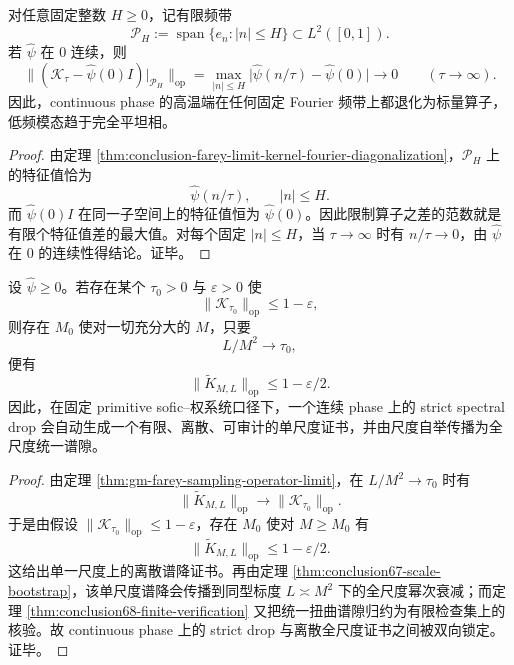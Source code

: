 \begin{theorem}[高温端在固定频带上的完全平坦化]\label{thm:conclusion-farey-hightemperature-fixedband-flattening}
对任意固定整数 \(H\ge 0\)，记有限频带
\[
\mathcal P_H:=\operatorname{span}\{e_n:|n|\le H\}\subset L^2([0,1]).
\]
若 \(\widehat\psi\) 在 \(0\) 连续，则
\[
\bigl\|(\mathcal K_\tau-\widehat\psi(0)I)|_{\mathcal P_H}\bigr\|_{\mathrm{op}}
=
\max_{|n|\le H}\bigl|\widehat\psi(n/\tau)-\widehat\psi(0)\bigr|
\longrightarrow 0
\qquad (\tau\to\infty).
\]
因此，continuous phase 的高温端在任何固定 Fourier 频带上都退化为标量算子，低频模态趋于完全平坦相。
\end{theorem}
\begin{proof}
由定理 \ref{thm:conclusion-farey-limit-kernel-fourier-diagonalization}，\(\mathcal P_H\) 上的特征值恰为
\[
\widehat\psi(n/\tau),
\qquad |n|\le H.
\]
而 \(\widehat\psi(0)I\) 在同一子空间上的特征值恒为 \(\widehat\psi(0)\)。因此限制算子之差的范数就是有限个特征值差的最大值。对每个固定 \(|n|\le H\)，当 \(\tau\to\infty\) 时有 \(n/\tau\to 0\)，由 \(\widehat\psi\) 在 \(0\) 的连续性得结论。证毕。
\end{proof}

\begin{theorem}\label{thm:conclusion-continuous-strict-drop-implies-discrete-finite-certificate}
设 \(\widehat\psi\ge 0\)。若存在某个 \(\tau_0>0\) 与 \(\varepsilon>0\) 使
\[
\|\mathcal K_{\tau_0}\|_{\mathrm{op}}\le 1-\varepsilon,
\]
则存在 \(M_0\) 使对一切充分大的 \(M\)，只要
\[
L/M^2\to\tau_0,
\]
便有
\[
\|\widetilde K_{M,L}\|_{\mathrm{op}}\le 1-\varepsilon/2.
\]
因此，在固定 primitive sofic--权系统口径下，一个连续 phase 上的 strict spectral drop 会自动生成一个有限、离散、可审计的单尺度证书，并由尺度自举传播为全尺度统一谱隙。
\end{theorem}
\begin{proof}
由定理 \ref{thm:gm-farey-sampling-operator-limit}，在 \(L/M^2\to\tau_0\) 时有
\[
\|\widetilde K_{M,L}\|_{\mathrm{op}}\longrightarrow \|\mathcal K_{\tau_0}\|_{\mathrm{op}}.
\]
于是由假设 \(\|\mathcal K_{\tau_0}\|_{\mathrm{op}}\le 1-\varepsilon\)，存在 \(M_0\) 使对 \(M\ge M_0\) 有
\[
\|\widetilde K_{M,L}\|_{\mathrm{op}}\le 1-\varepsilon/2.
\]
这给出单一尺度上的离散谱降证书。再由定理 \ref{thm:conclusion67-scale-bootstrap}，该单尺度谱降会传播到同型标度 \(L\asymp M^2\) 下的全尺度幂次衰减；而定理 \ref{thm:conclusion68-finite-verification} 又把统一扭曲谱隙归约为有限检查集上的核验。故 continuous phase 上的 strict drop 与离散全尺度证书之间被双向锁定。证毕。
\end{proof}

